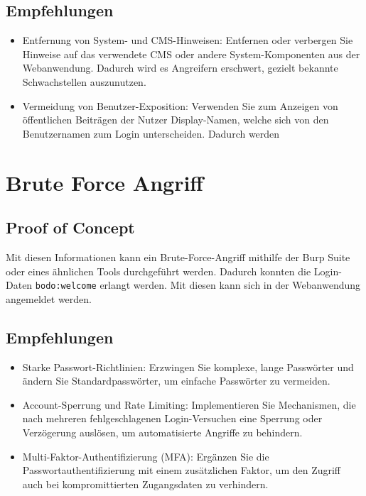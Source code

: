 \subsection*{Empfehlungen}
\begin{itemize}
    \item Entfernung von System- und CMS-Hinweisen: Entfernen oder verbergen Sie Hinweise auf das verwendete CMS oder andere System-Komponenten aus der Webanwendung. Dadurch wird es Angreifern erschwert, gezielt bekannte Schwachstellen auszunutzen.
    \item Vermeidung von Benutzer-Exposition: Verwenden Sie zum Anzeigen von öffentlichen Beiträgen der Nutzer Display-Namen, welche sich von den Benutzernamen zum Login unterscheiden. Dadurch werden 
\end{itemize}


\section{\makecvssbadge Brute Force Angriff}

\subsection*{Proof of Concept}
Mit diesen Informationen kann ein Brute-Force-Angriff mithilfe der Burp Suite oder eines ähnlichen Tools durchgeführt werden. Dadurch konnten die Login-Daten \texttt{bodo:welcome} erlangt werden. Mit diesen kann sich in der Webanwendung angemeldet werden.

\subsection*{Empfehlungen}
\begin{itemize}
    \item Starke Passwort-Richtlinien: Erzwingen Sie komplexe, lange Passwörter und ändern Sie Standardpasswörter, um einfache Passwörter zu vermeiden.
    \item Account-Sperrung und Rate Limiting: Implementieren Sie Mechanismen, die nach mehreren fehlgeschlagenen Login-Versuchen eine Sperrung oder Verzögerung auslösen, um automatisierte Angriffe zu behindern.
    \item Multi-Faktor-Authentifizierung (MFA): Ergänzen Sie die Passwortauthentifizierung mit einem zusätzlichen Faktor, um den Zugriff auch bei kompromittierten Zugangsdaten zu verhindern.
\end{itemize}

